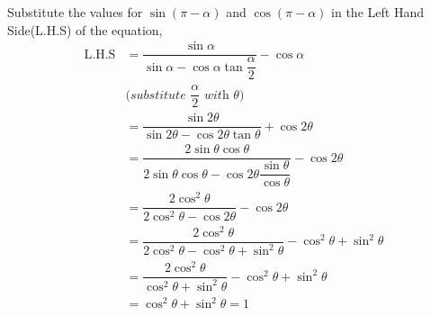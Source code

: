 \begin{solution}[\halfpage]
  Substitute the values for $\sin(\pi - \alpha)$ and $\cos(\pi - \alpha)$ 
  in the Left Hand Side(L.H.S) of the equation,
  \begin{align}
    \text{L.H.S} &= \dfrac{\sin\alpha}{\sin\alpha -
    				  \cos\alpha\tan\dfrac{\alpha}{2}}
					  - \cos\alpha \\
    &\textit{(substitute $\dfrac{\alpha}{2}$ with $\theta$)} \nonumber \\
				 &= \dfrac{\sin 2\theta}{\sin 2\theta - 
				 	  \cos 2\theta\tan\theta} + \cos 2\theta \\	
				 &= \dfrac{2\sin\theta\cos\theta}{2\sin\theta\cos\theta - 
				 	  \cos 2\theta\dfrac{\sin\theta}{\cos\theta}} 
				 	  - \cos 2\theta \\
				 &= \dfrac{2\cos ^2\theta}{2\cos^2\theta - 
				 	  \cos 2\theta} - \cos 2\theta \\
				 &= \dfrac{2\cos ^2\theta}{2\cos^2\theta - 
				 	  \cos^2\theta + \sin^2\theta} - \cos^2\theta + \sin^2\theta \\
				 &= \dfrac{2\cos^2\theta}{\cos^2\theta + \sin^2\theta} -
				 	  \cos^2\theta + \sin^2\theta \\
				 &= \cos^2\theta + \sin^2\theta = 1
  \end{align}
\end{solution}
